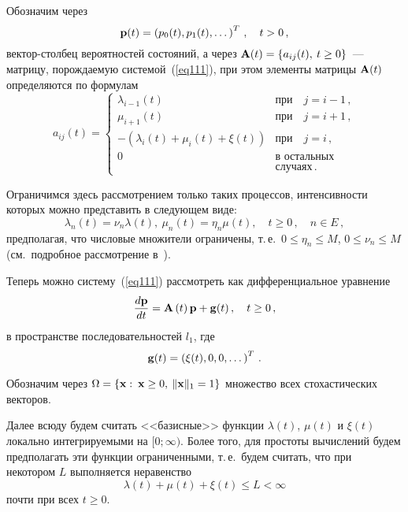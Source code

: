 \begin{multicols}{2}
Обозначим через 
$$
{\mathbf p}(t)=\left(p_0(t),p_1(t),\dots\right)^T\,,\quad t>0\,,
$$
вектор-столбец вероятностей состояний, а через
${\mathbf A}(t)=\left\{a_{ij}(t),\: t\geq 0\right\}$~--- матрицу, порождаемую
сис\-те\-мой~(\ref{eq111}), при этом элементы  матрицы ${\mathbf A}(t)$
определяются по формулам
\begin{equation*}
a_{ij} (t) = 
\begin{cases}
\lambda _{i-1}\left( t\right) & \mbox {при} \quad j=i-1\,, \\
\mu _{i+1}\left( t\right) & \mbox {при} \quad j=i+1\,,\\
-\left( \lambda _i\left( t\right) +\mu _i\left( t\right) +\xi(t) \right) & \mbox {при} \quad j=i\,, \\
0 &   \mbox{в остальных}\\
& \mbox{случаях}\,.
\end{cases}
\end{equation*}

Ограничимся здесь рассмотрением только таких процессов,
интенсивности которых можно представить в следующем виде:
\begin{equation*}
\lambda _n\left( t\right) =\nu_n \lambda \left( t\right),\  \mu
_n\left( t\right) =\eta_n \mu \left( t\right), \quad t\ge 0\,, \quad n\in E\,,
\end{equation*}
предполагая, что числовые множители ограничены, т.\,е.\ $ 0 \le
\eta_n \leq M$,  $0 \leq \nu_n \leq M $ (см.\
подробное рассмотрение в~\cite{z06}).

Теперь можно систему~(\ref{eq111}) рассмотреть как дифференциальное
уравнение
\begin{equation}
\displaystyle\frac{\displaystyle d{\mathbf p}\mathstrut}{\displaystyle dt\mathstrut}={\mathbf A}\left( t\right) {\mathbf p}  +{\bf g} (t)\,, \quad t\ge 0\,,
\label{eq112}
\end{equation}
в пространстве последовательностей  $l_1$, где 
$$
{\bf g}(t)=\left(\xi (t),0,0, \dots\right)^T\,.
$$

Обозначим через $\Omega=\left\{{\bf x}: \: {\bf x}\geq 0,\: \|{\bf
x}\|_1=1\right\}$ множество всех стохастических векторов.

Далее всюду будем считать <<базисные>> функции $\lambda(t)$,
$\mu(t)$ и $\xi(t)$ локально интегрируемыми на $[0;\infty)$. Более
того, для простоты вычислений будем предполагать эти функции
ограниченными, т.\,е.\ будем считать, что при некотором $L$
выполняется неравенство
\begin{equation*}
\lambda(t) + \mu(t) + \xi(t) \le L < \infty 
\end{equation*}
почти при всех $t \ge 0$.


\end{multicols}
